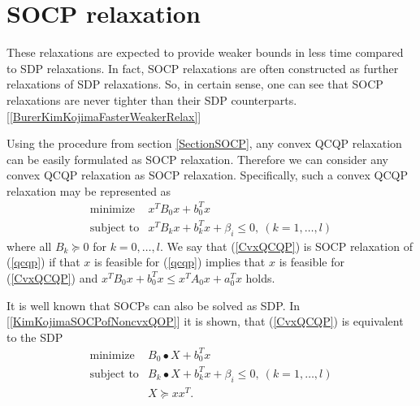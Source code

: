 \documentclass[10pt,oneside]{book}
\theoremstyle{definition}
\begin{document}
\section{SOCP relaxation}
These relaxations are expected to provide weaker bounds in less time compared to SDP relaxations. In fact, SOCP relaxations are often constructed as further relaxations of SDP relaxations. So, in certain sense, one can see that SOCP relaxations are never tighter than their SDP counterparts. [\ref{BurerKimKojimaFasterWeakerRelax}]

Using the procedure from section \ref{SectionSOCP}, any convex QCQP relaxation can be easily formulated as SOCP relaxation. Therefore we can consider any convex QCQP relaxation as SOCP relaxation. 
Specifically, such a convex QCQP relaxation may be represented as 
\begin{equation}
\label{CvxQCQP} 
\begin{array}{ll}
\mbox{minimize}& x^TB_0x + b_0^Tx \\
\mbox{subject to}& x^TB_kx + b_k^Tx + \beta_i \leq 0, \  (k = 1,\dots ,l)
\end{array} 
\end{equation}
where all $B_k\succeq 0$ for $k=0,\dots ,l$. We say that (\ref{CvxQCQP}) is SOCP relaxation of (\ref{qcqp}) if that $x$ is feasible for (\ref{qcqp}) implies that $x$ is feasible for (\ref{CvxQCQP}) and $x^TB_0x+b_0^Tx \leq x^TA_0x+a_0^Tx$ holds.

It is well known that SOCPs can also be solved as SDP. In [\ref{KimKojimaSOCPofNoncvxQOP}] it is shown, that (\ref{CvxQCQP}) is equivalent to the SDP 
\begin{equation}
\label{SDPofCvxQCQP} 
\begin{array}{ll}
\mbox{minimize}& B_0\bullet X + b_0^Tx \\
\mbox{subject to}& B_k\bullet X + b_k^Tx + \beta_i \leq 0, \  (k = 1,\dots ,l)\\
& X\succeq xx^T.
\end{array} 
\end{equation}
\end{document}
